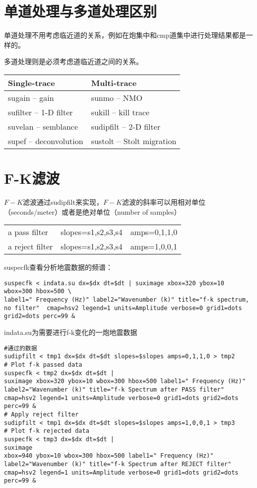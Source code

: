 \section{单道处理与多道处理区别}
单道处理不用考虑临近道的关系，例如在炮集中和cmp道集中进行处理结果都是一样的。\par
多道处理则是必须考虑道临近道之间的关系。\par
\begin{tabular}{ll}
\toprule
Single-trace & Multi-trace\\
\midrule
sugain – gain & sunmo – NMO\\
sufilter – 1-D filter & sukill – kill trace\\
suvelan – semblance & sudipfilt – 2-D filter\\
supef – deconvolution & sustolt – Stolt migration\\
\bottomrule
\end{tabular}\par

\section{F-K滤波}
$F-K$滤波通过sudipfilt来实现，$F-K$滤波的斜率可以用相对单位（seconds/meter）或者是绝对单位（number of samples）\par
\begin{tabular}{|lll|}
	\toprule
 a pass filter &  slopes=s1,s2,s3,s4  &  amps=0,1,1,0\\

a reject filter  &  slopes=s1,s2,s3,s4  &  amps=1,0,0,1\\
\bottomrule
\end{tabular}\par\mvspace\mvspace
suspecfk查看分析地震数据的频谱：
\begin{lstlisting}
suspecfk < indata.su dx=$dx dt=$dt | suximage xbox=320 ybox=10 wbox=300 hbox=500 \
label1=" Frequency (Hz)" label2="Wavenumber (k)" title="f-k spectrum, no filter"  cmap=hsv2 legend=1 units=Amplitude verbose=0 grid1=dots grid2=dots perc=99 &
\end{lstlisting}
indata.su为需要进行f-k变化的一炮地震数据
\begin{lstlisting}
#通过的数据
sudipfilt < tmp1 dx=$dx dt=$dt slopes=$slopes amps=0,1,1,0 > tmp2
# Plot f-k passed data
suspecfk < tmp2 dx=$dx dt=$dt | 
suximage xbox=320 ybox=10 wbox=300 hbox=500 label1=" Frequency (Hz)" label2="Wavenumber (k)" title="f-k Spectrum after PASS filter" cmap=hsv2 legend=1 units=Amplitude verbose=0 grid1=dots grid2=dots perc=99 &
# Apply reject filter
sudipfilt < tmp1 dx=$dx dt=$dt slopes=$slopes amps=1,0,0,1 > tmp3
# Plot f-k rejected data
suspecfk < tmp3 dx=$dx dt=$dt |
suximage
xbox=940 ybox=10 wbox=300 hbox=500 label1=" Frequency (Hz)" label2="Wavenumber (k)" title="f-k Spectrum after REJECT filter" cmap=hsv2 legend=1 units=Amplitude verbose=0 grid1=dots grid2=dots perc=99 &
\end{lstlisting}

